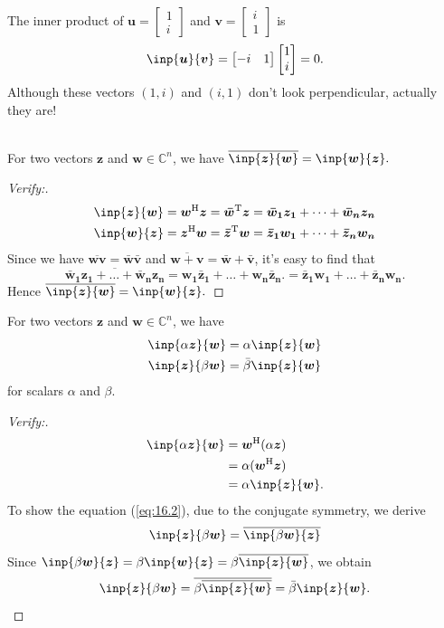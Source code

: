 \begin{example}
The inner product of $\bm u=\begin{bmatrix}
1\\i
\end{bmatrix}$ and $\bm v=\begin{bmatrix}
i\\1
\end{bmatrix}$ is 
\[
\inp{\bm u}{\bm v}=\begin{bmatrix}
-i&1
\end{bmatrix}\begin{bmatrix}
1\\i
\end{bmatrix}=0.
\]
Although these vectors $(1,i)$ and $(i,1)$ don't look  perpendicular, actually they are!
\end{example}
\begin{proposition}\qquad\\
For two vectors $\bm z$ and $\bm w\in\mathbb{C}^{n}$, we have $\overline{\inp{\bm z}{\bm w}}=\inp{\bm w}{\bm z}.$
\end{proposition}
\begin{proof}[Verify:]
\begin{gather*}
\inp{\bm z}{\bm w}=\bm w\Her\bm z=\bm{\bar w}\trans\bm z
=\bm{\bar w_1}\bm{z_1}+\dots+\bm{\bar w_n}\bm{z_n}
\\
\inp{\bm w}{\bm z}=\bm z\Her\bm w=\bm{\bar z}\trans\bm w
=\bm{\bar z_1}\bm{w_1}+\dots+\bm{\bar z_n}\bm{w_n}
\end{gather*}
Since we have $\overline{\bm w\bm v}=\bm{\bar w}\bm{\bar v}$ and $\overline{\bm w+\bm v}=\bm{\bar w}+\bm{\bar v}$, it's easy to find that
\[
\overline{\bm{\bar w_1}\bm{z_1}+\dots+\bm{\bar w_n}\bm{z_n}}
=\bm{w_1}\bm{\bar z_1}+\dots+\bm{w_n}\bm{\bar z_n}.
=\bm{\bar z_1}\bm{w_1}+\dots+\bm{\bar z_n}\bm{w_n}.
\]
Hence $\overline{\inp{\bm z}{\bm w}}=\inp{\bm w}{\bm z}.$
\end{proof}
\begin{proposition}[Sesquilinear]
For two vectors $\bm z$ and $\bm w\in\mathbb{C}^{n}$, we have
\begin{gather}
\inp{\alpha\bm z}{\bm w}=\alpha\inp{\bm z}{\bm w}\\
\inp{\bm z}{\beta\bm w}=\bar\beta\inp{\bm z}{\bm w}\label{eq:16.2}
\end{gather}
for scalars $\alpha$ and $\beta$.
\end{proposition}
\begin{proof}[Verify:]
\begin{align*}
\inp{\alpha\bm z}{\bm w}&=\bm w\Her(\alpha\bm z)\\&=\alpha(\bm w\Her\bm z)\\&=\alpha\inp{\bm z}{\bm w}.
\end{align*}
To show the equation (\ref{eq:16.2}), due to the conjugate symmetry, we derive
\[
\inp{\bm z}{\beta\bm w}=\overline{\inp{\beta\bm w}{\bm z}}
\]
Since $\inp{\beta\bm w}{\bm z}=\beta\inp{\bm w}{\bm z}=\beta\overline{\inp{\bm z}{\bm w}}$, we obtain
\[
\inp{\bm z}{\beta\bm w}=\overline{\beta\overline{\inp{\bm z}{\bm w}}}=\bar\beta\inp{\bm z}{\bm w}.
\]
\end{proof}

